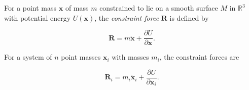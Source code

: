 For a point mass $\mathbf{x}$ of mass $m$ constrained to lie on a smooth surface $M$ in $\mathbb{R}^3$ with potential energy $U(\mathbf{x})$, the \textit{constraint force} $\mathbf{R}$ is defined by

$$\mathbf{R} = m \ddot{\mathbf{x}} + \frac{\partial U}{\partial \mathbf{x}}.$$

For a system of $n$ point masses $\mathbf{x}_i$ with masses $m_i$, the constraint forces are

$$\mathbf{R}_i = m_i \ddot{\mathbf{x}}_i + \frac{\partial U}{\partial \mathbf{x}_i}.$$
